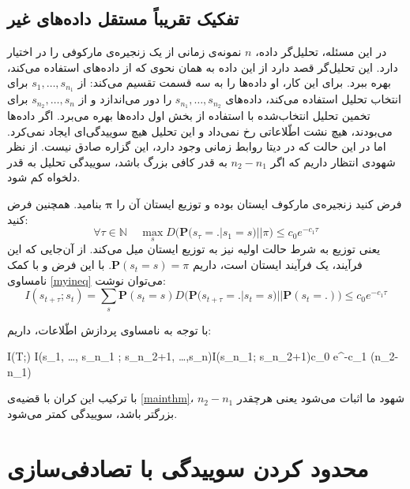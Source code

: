 \documentclass[a4paper,12pt]{article}
\begin{document}
	\subsection{تفکیک تقریباً مستقل داده‌های غیر
	}
	
	در این مسئله، تحلیل‌گر داده،
	$n$
	نمونه‌ی زمانی از یک زنجیره‌ی مارکوفی را در اختیار دارد. این تحلیل‌گر قصد دارد از این داده به همان نحوی که از داده‌های 
	استفاده می‌کند، بهره ببرد. برای این کار، او داده‌ها را به سه قسمت تقسیم می‌کند:
	از 
	$s_1,\dots, s_{n_1}$
	برای انتخاب تحلیل استفاده می‌کند، داده‌‌های
	$s_{n_1},\dots, s_{n_2}$
	را دور می‌اندازد و از
	$s_{n_2},\dots, s_{n}$
	برای تخمین تحلیل انتخاب‌شده با استفاده از بخش اول داده‌ها بهره می‌برد. اگر داده‌ها 
	می‌بودند، هیچ نشت اطّلاعاتی رخ نمی‌داد و این تحلیل هیچ سوییدگی‌ای ایجاد نمی‌کرد. اما در این حالت که در دیتا روابط زمانی وجود دارد، این گزاره صادق نیست. از نظر شهودی انتظار داریم که اگر
	$n_2 - n_1$
	به قدر کافی بزرگ باشد، سوییدگی تحلیل به قدر دلخواه کم شود.
	
	
	فرض کنید زنجیره‌ی مارکوف ایستان بوده و توزیع ایستان آن را 
	$\mathbf{\pi}$
	بنامید. همچنین فرض کنید:
	\begin{equation}
	\forall \tau \in \mathbb{N} \;\;\;\; \max_s D \Big (\mathbf{P}(s_{\tau} = .| s_1 = s) || \pi \Big) \leq c_0 e^{- c_1 \tau}
	\label{myineq}
	\end{equation}
	یعنی توزیع به شرط حالت اولیه نیز به توزیع ایستان میل می‌کند. از آن‌جایی که این فرآیند، یک فرآیند ایستان است، داریم
	$\mathbf{P}(s_t = s) = \pi$.
	با این فرض و با کمک نامساوی
	\eqref{myineq}
	می‌توان نوشت:
	$$I(s_{t+\tau}; s_t) = \sum_{s} \mathbf{P}(s_t=s) D \Big( \mathbf{P}\big(s_{t+\tau} = .|s_t=s\big) ||\mathbf{P}(s_t=.) \Big) \leq c_0 e^{-c_1\tau}$$
	
	با توجه به نامساوی پردازش اطّلاعات، داریم:
	\begin{flalign}
	I(T;\phi) \leq I(s_1, \dots, s_{n_1} ; s_{n_2+1}, \dots ,s_n)\leq I(s_{n_1}; s_{n_2+1})\leq c_0 e^{-c_1 (n_2-n_1)}
	\end{flalign}
	
	با ترکیب این کران با قضیه‌ی 
	\eqref{mainthm}،
	شهود ما اثبات می‌شود یعنی هر‌چقدر
	$n_2 - n_1$
	بزرگتر باشد، سوییدگی کمتر می‌شود.
	
	
	
	
	
	\section{محدود کردن سوییدگی با تصادفی‌سازی}\label{randomization}
	
\end{document}
